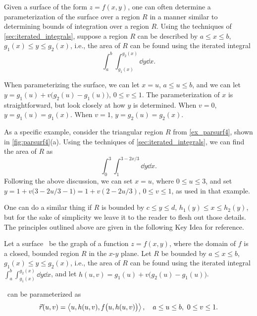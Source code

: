 Given a surface of the form $z=f(x,y)$, one can often determine a parameterization of the surface over a region $R$ in a manner similar to determining bounds of integration over a region $R$. Using the techniques of \autoref{sec:iterated_integrals}, suppose a region $R$ can be described by $a\leq x\leq b$, $g_1(x) \leq y\leq g_2(x)$, i.e., the area of $R$ can be found using the iterated integral
\[\int_a^b\int_{g_1(x)}^{g_2(x)}\dd y\dd x.\]

When parameterizing the surface, we can let $x=u$, $a\leq u\leq b$, and we can let $y = g_1(u)+v\bigl(g_2(u)-g_1(u)\bigr)$, $0\leq v\leq 1$. The parameterization of $x$ is straightforward, but look closely at how $y$ is determined. When $v=0$, $y=g_1(u) = g_1(x)$. When $v=1$, $y= g_2(u)=g_2(x)$. 

As a specific example, consider the triangular region $R$ from \autoref{ex_parsurf4}, shown in \autoref{fig:parsurf4}(a). Using the techniques of \autoref{sec:iterated_integrals}, we can find the area of $R$ as
\[\int_0^3\int_1^{3-2x/3}\dd y\dd x.\]
Following the above discussion, we can set $x=u$, where $0\leq u\leq 3$, and set $y = 1+ v\bigl(3-2u/3-1\bigr) = 1+v(2-2u/3)$, $0\leq v\leq 1$, as used in that example.

One can do a similar thing if $R$ is bounded by $c\leq y\leq d$, $h_1(y)\leq x\leq h_2(y)$, but for the sake of simplicity we leave it to the reader to flesh out those details. The principles outlined above are given in the following Key Idea for reference.

\begin{keyidea}\label{idea:parameterizing_surfaces}%
Let a surface \surfaceS\ be the graph of a function $z=f(x,y)$, where the domain of $f$ is  a closed, bounded region $R$ in the $x$-$y$ plane. 
Let $R$ be bounded by $a\leq x\leq b$, $g_1(x)\leq y\leq g_2(x)$, i.e., the area of $R$ can be found using the iterated integral $\int_a^b\int_{g_1(x)}^{g_2(x)}\dd y\dd x$, and let $h(u,v) = g_1(u)+v\bigl(g_2(u)-g_1(u)\bigr)$. 

\surfaceS\ can be parameterized as 
\[
\vec r(u,v)
= \left\langle u, h(u,v), f\bigl(u,h(u,v)\bigr)\right\rangle,\quad a\leq u\leq b,\ 0\leq v\leq 1.
\]
\end{keyidea}

